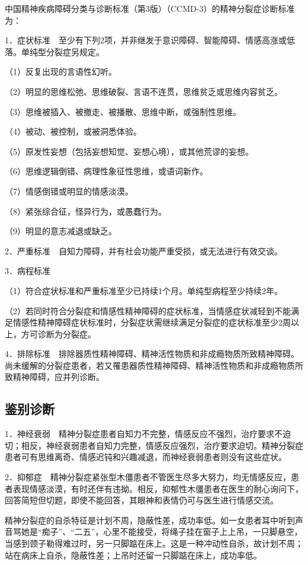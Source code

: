 中国精神疾病障碍分类与诊断标准（第3版）（CCMD-3）的精神分裂症诊断标准为：

1．症状标准　至少有下列2项，并非继发于意识障碍、智能障碍、情感高涨或低落。单纯型分裂症另规定。

（1）反复出现的言语性幻听。

（2）明显的思维松弛、思维破裂、言语不连贯，思维贫乏或思维内容贫乏。

（3）思维被插入、被撤走、被播散、思维中断，或强制性思维。

（4）被动、被控制，或被洞悉体验。

（5）原发性妄想（包括妄想知觉、妄想心境），或其他荒谬的妄想。

（6）思维逻辑倒错、病理性象征性思维，或语词新作。

（7）情感倒错或明显的情感淡漠。

（8）紧张综合征，怪异行为，或愚蠢行为。

（9）明显的意志减退或缺乏。

2．严重标准　自知力障碍，并有社会功能严重受损，或无法进行有效交谈。

3．病程标准

（1）符合症状标准和严重标准至少已持续1个月。单纯型病程至少持续2年。

（2）若同时符合分裂症和情感性精神障碍的症状标准，当情感症状减轻到不能满足情感性精神障碍症状标准时，分裂症状需继续满足分裂症的症状标准至少2周以上，方可诊断为分裂症。

4．排除标准　排除器质性精神障碍、精神活性物质和非成瘾物质所致精神障碍。尚未缓解的分裂症患者，若又罹患器质性精神障碍、精神活性物质和非成瘾物质所致精神障碍，应并列诊断。

\subsection{鉴别诊断}

1．神经衰弱　精神分裂症患者自知力不完整，情感反应不强烈，治疗要求不迫切；相反，神经衰弱患者自知力完整，情感反应强烈，治疗要求迫切。精神分裂症患者可有思维离奇、情感迟钝和兴趣减退，而神经衰弱患者则没有这些症状。

2．抑郁症　精神分裂症紧张型木僵患者不管医生尽多大努力，均无情感反应，患者表现情感淡漠，有时还伴有违拗。相反，抑郁性木僵患者在医生的耐心询问下，回答简短但切题，即使不能回答，其眼神和表情仍可与医生进行情感交流。

精神分裂症的自杀特征是计划不周，隐蔽性差，成功率低。如一女患者耳中听到声音骂她是``痴子''、``二五''，心里不能接受，将绳子挂在窗子上上吊，一只脚悬空，当感到颈子勒得难过时，另一只脚踮在床上。这是一种冲动性自杀，故计划不周；站在病床上自杀，隐蔽性差；上吊时还留一只脚踮在床上，成功率低。

